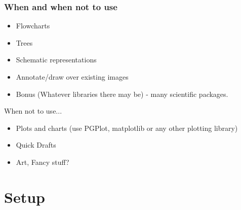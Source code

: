 \documentclass{beamer}
\begin{document}
\begin{frame}
    \begin{figure}
        
    \end{figure}
\end{frame}


\begin{frame}
    \frametitle{When and when not to use}

    \begin{itemize}
        \item Flowcharts
        \item Trees
        \item Schematic representations
        \item Annotate/draw over existing images
        \item Bonus (Whatever libraries there may be) - many scientific packages.
     \end{itemize}

     \begin{block}{When not to use...}
     \begin{itemize}
         \item Plots and charts (use PGPlot, matplotlib or any other plotting library)
         \item Quick Drafts
         \item Art, Fancy stuff?
     \end{itemize}
    \end{block}
\end{frame}


\section{Setup}
\end{document}

